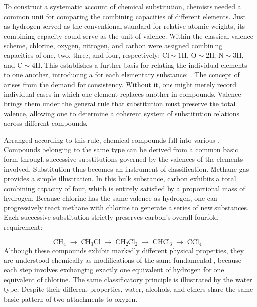 \documentclass[submitted,12pt]{article}
\begin{document}
To construct a systematic account of chemical substitution, chemists needed a common unit for comparing the combining capacities of different elements. Just as hydrogen served as the conventional standard for relative atomic weights, its combining capacity could serve as the unit of valence. Within the classical valence scheme, chlorine, oxygen, nitrogen, and carbon were assigned combining capacities of one, two, three, and four, respectively: $\mathrm{Cl}\sim 1\mathrm{H}$, $\mathrm{O}\sim 2\mathrm{H}$, $\mathrm{N}\sim 3\mathrm{H}$, and $\mathrm{C}\sim 4\mathrm{H}$. This establishes a further basis for relating the individual elements to one another, introducing a  for each elementary substance:  . The concept of  arises from the demand for consistency. Without it, one might merely record individual cases in which one element replaces another in compounds. Valence brings them under the general rule that substitution must preserve the total valence, allowing one to determine a coherent system of substitution relations across different compounds.

Arranged according to this rule, chemical compounds fall into various   . Compounds belonging to the same type can be derived from a common basic form through successive substitutions governed by the valences of the elements involved. Substitution thus becomes an instrument of classification. Methane gas provides a simple illustration. In this bulk substance, carbon exhibits a total combining capacity of four, which is entirely satisfied by a proportional mass of hydrogen. Because chlorine has the same valence as hydrogen, one can progressively react methane with chlorine to generate a series of new substances. Each successive substitution strictly preserves carbon's overall fourfold requirement: 

\[
\mathrm{CH}_4
\;\longrightarrow\;
\mathrm{CH}_3\mathrm{Cl}
\;\longrightarrow\;
\mathrm{CH}_2\mathrm{Cl}_2
\;\longrightarrow\;
\mathrm{CHCl}_3
\;\longrightarrow\;
\mathrm{CCl}_4.
\]
%
Although these compounds exhibit markedly different physical properties, they are understood chemically as modifications of the same fundamental , because each step involves exchanging exactly one equivalent of hydrogen for one equivalent of chlorine. The same classificatory principle is illustrated by the water type. Despite their different properties, water, alcohols, and ethers share the same basic pattern of two attachments to oxygen.
\end{document}
